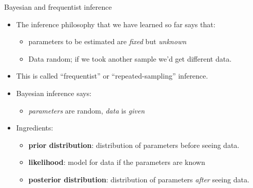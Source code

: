 \documentclass[
  ignorenonframetext,
]{beamer}
\providecommand{\tightlist}{%
  \setlength{\itemsep}{0pt}\setlength{\parskip}{0pt}}
\begin{document}
\begin{frame}{Bayesian and frequentist inference}
\protect\hypertarget{bayesian-and-frequentist-inference}{}

\begin{itemize}
\tightlist
\item
  The inference philosophy that we have learned so far says that:

  \begin{itemize}
  \tightlist
  \item
    parameters to be estimated are \emph{fixed} but \emph{unknown}
  \item
    Data random; if we took another sample we'd get different data.
  \end{itemize}
\item
  This is called ``frequentist'' or ``repeated-sampling'' inference.
\item
  Bayesian inference says:

  \begin{itemize}
  \tightlist
  \item
    \emph{parameters} are random, \emph{data} is \emph{given}
  \end{itemize}
\item
  Ingredients:

  \begin{itemize}
  \tightlist
  \item
    \textbf{prior distribution}: distribution of parameters before
    seeing data.
  \item
    \textbf{likelihood}: model for data if the parameters are known
  \item
    \textbf{posterior distribution}: distribution of parameters
    \emph{after} seeing data.
  \end{itemize}
\end{itemize}

\end{frame}
\end{document}
